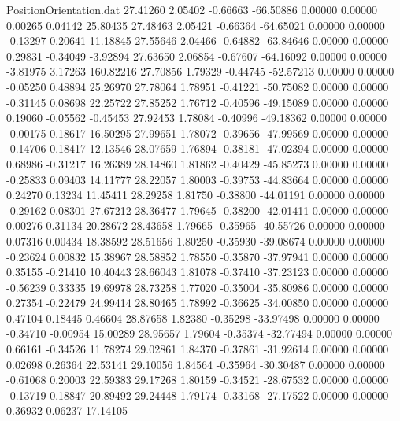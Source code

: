 \begin{filecontents}{PositionOrientation.dat}
  27.41260    2.05402   -0.66663   -66.50886    0.00000    0.00000    0.00265    0.04142   25.80435
  27.48463    2.05421   -0.66364   -64.65021    0.00000    0.00000   -0.13297    0.20641   11.18845
  27.55646    2.04466   -0.64882   -63.84646    0.00000    0.00000    0.29831   -0.34049   -3.92894
  27.63650    2.06854   -0.67607   -64.16092    0.00000    0.00000   -3.81975    3.17263  160.82216
  27.70856    1.79329   -0.44745   -52.57213    0.00000    0.00000   -0.05250    0.48894   25.26970
  27.78064    1.78951   -0.41221   -50.75082    0.00000    0.00000   -0.31145    0.08698   22.25722
  27.85252    1.76712   -0.40596   -49.15089    0.00000    0.00000    0.19060   -0.05562   -0.45453
  27.92453    1.78084   -0.40996   -49.18362    0.00000    0.00000   -0.00175    0.18617   16.50295
  27.99651    1.78072   -0.39656   -47.99569    0.00000    0.00000   -0.14706    0.18417   12.13546
  28.07659    1.76894   -0.38181   -47.02394    0.00000    0.00000    0.68986   -0.31217   16.26389
  28.14860    1.81862   -0.40429   -45.85273    0.00000    0.00000   -0.25833    0.09403   14.11777
  28.22057    1.80003   -0.39753   -44.83664    0.00000    0.00000    0.24270    0.13234   11.45411
  28.29258    1.81750   -0.38800   -44.01191    0.00000    0.00000   -0.29162    0.08301   27.67212
  28.36477    1.79645   -0.38200   -42.01411    0.00000    0.00000    0.00276    0.31134   20.28672
  28.43658    1.79665   -0.35965   -40.55726    0.00000    0.00000    0.07316    0.00434   18.38592
  28.51656    1.80250   -0.35930   -39.08674    0.00000    0.00000   -0.23624    0.00832   15.38967
  28.58852    1.78550   -0.35870   -37.97941    0.00000    0.00000    0.35155   -0.21410   10.40443
  28.66043    1.81078   -0.37410   -37.23123    0.00000    0.00000   -0.56239    0.33335   19.69978
  28.73258    1.77020   -0.35004   -35.80986    0.00000    0.00000    0.27354   -0.22479   24.99414
  28.80465    1.78992   -0.36625   -34.00850    0.00000    0.00000    0.47104    0.18445    0.46604
  28.87658    1.82380   -0.35298   -33.97498    0.00000    0.00000   -0.34710   -0.00954   15.00289
  28.95657    1.79604   -0.35374   -32.77494    0.00000    0.00000    0.66161   -0.34526   11.78274
  29.02861    1.84370   -0.37861   -31.92614    0.00000    0.00000    0.02698    0.26364   22.53141
  29.10056    1.84564   -0.35964   -30.30487    0.00000    0.00000   -0.61068    0.20003   22.59383
  29.17268    1.80159   -0.34521   -28.67532    0.00000    0.00000   -0.13719    0.18847   20.89492
  29.24448    1.79174   -0.33168   -27.17522    0.00000    0.00000    0.36932    0.06237   17.14105

\end{filecontents}
